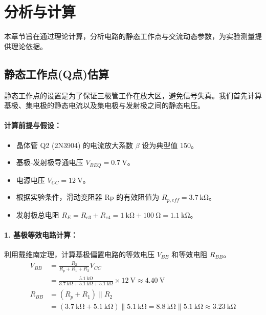 \documentclass[UTF8, a4paper]{ctexrep} %
\begin{document}
\section{分析与计算}
\label{sec:analysis}

本章节旨在通过理论计算，分析电路的静态工作点与交流动态参数，为实验测量提供理论依据。

\subsection{静态工作点(Q点)估算}

静态工作点的设置是为了保证三极管工作在放大区，避免信号失真。我们首先计算基极、集电极的静态电流以及集电极与发射极之间的静态电压。

\paragraph{计算前提与假设：}
\begin{itemize}
    \item 晶体管 Q2 (2N3904) 的电流放大系数 $\beta$ 设为典型值 150。
    \item 基极-发射极导通电压 $V_{BEQ} = \SI{0.7}{\volt}$。
    \item 电源电压 $V_{CC} = \SI{12}{\volt}$。
    \item 根据实验条件，滑动变阻器 Rp 的有效阻值为 $R_{p,eff} = \SI{3.7}{\kilo\ohm}$。
    \item 发射极总电阻 $R_E = R_{e3} + R_{e4} = \SI{1}{\kilo\ohm} + \SI{100}{\ohm} = \SI{1.1}{\kilo\ohm}$。
\end{itemize}

\paragraph{1. 基极等效电路计算：}
利用戴维南定理，计算基极偏置电路的等效电压 $V_{BB}$ 和等效电阻 $R_{BB}$。
\begin{align*}
    V_{BB} &= \frac{R_2}{R_p + R_1 + R_2} V_{CC} \\
           &= \frac{\SI{5.1}{\kilo\ohm}}{\SI{3.7}{\kilo\ohm} + \SI{5.1}{\kilo\ohm} + \SI{5.1}{\kilo\ohm}} \times \SI{12}{\volt} \approx \SI{4.40}{\volt} \\
    R_{BB} &= (R_p + R_1) \parallel R_2 \\
           &= (\SI{3.7}{\kilo\ohm} + \SI{5.1}{\kilo\ohm}) \parallel \SI{5.1}{\kilo\ohm} = \SI{8.8}{\kilo\ohm} \parallel \SI{5.1}{\kilo\ohm} \approx \SI{3.23}{\kilo\ohm}
\end{align*}
\end{document}
